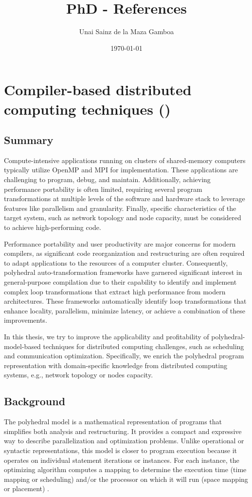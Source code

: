 \documentclass[a4paper, 11pt]{article}
\title{PhD - References}
\author{Unai Sainz de la Maza Gamboa}
\date{\today}
\begin{document}
\maketitle
\tableofcontents
\clearpage

% 
% 
% 

\section{Compiler-based distributed computing techniques ()}
\subsection{Summary}
Compute-intensive applications running on clusters of shared-memory computers typically utilize OpenMP and MPI for implementation. These applications are challenging to program, debug, and maintain. Additionally, achieving performance portability is often limited, requiring several program transformations at multiple levels of the software and hardware stack to leverage features like parallelism and granularity. Finally, specific characteristics of the target system, such as network topology and node capacity, must be considered to achieve high-performing code.

Performance portability and user productivity are major concerns for modern compilers, as significant code reorganization and restructuring are often required to adapt applications to the resources of a computer cluster. Consequently, polyhedral auto-transformation frameworks have garnered significant interest in general-purpose compilation due to their capability to identify and implement complex loop transformations that extract high performance from modern architectures. These frameworks automatically identify loop transformations that enhance locality, parallelism, minimize latency, or achieve a combination of these improvements.

In this thesis, we try to improve the applicability and profitability of polyhedral-model-based techniques for distributed computing challenges, such as scheduling and communication optimization. Specifically, we enrich the polyhedral program representation with domain-specific knowledge from distributed computing systems, e.g., network topology or nodes capacity.

\subsection{Background}
The polyhedral model is a mathematical representation of programs that simplifies both analysis and restructuring. It provides a compact and expressive way to describe parallelization and optimization problems. Unlike operational or syntactic representations, this model is closer to program execution because it operates on individual statement iterations or instances. For each instance, the optimizing algorithm computes a mapping to determine the execution time (time mapping or scheduling) and/or the processor on which it will run (space mapping or placement) \cite{}.
\end{document}
